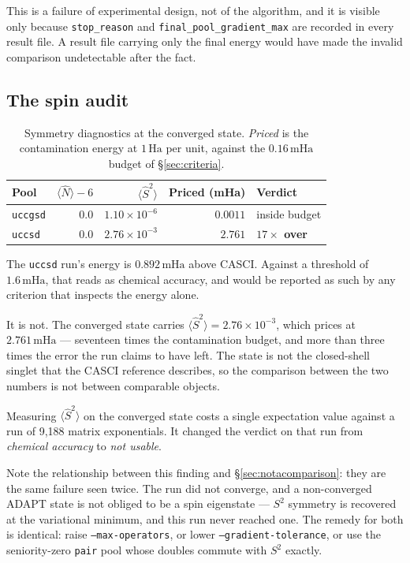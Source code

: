 \documentclass[11pt,a4paper]{article}
\newcommand{\mHa}{\ensuremath{\,\mathrm{mHa}}}
\newcommand{\Ha}{\ensuremath{\,\mathrm{Ha}}}
\newcommand{\Ssq}{\ensuremath{\langle \hat{S}^2 \rangle}}
\newcommand{\Nop}{\ensuremath{\langle \hat{N} \rangle}}
\newcommand{\code}[1]{\texttt{\small #1}}
\begin{document}
This is a failure of experimental design, not of the algorithm, and it is
visible only because \code{stop\_reason} and \code{final\_pool\_gradient\_max}
are recorded in every result file. A result file carrying only the final energy
would have made the invalid comparison undetectable after the fact.

\subsection{The spin audit}
\label{sec:spin}

\begin{table}[htbp]
\centering
\caption{Symmetry diagnostics at the converged state. \emph{Priced} is the
contamination energy at $1\Ha$ per unit, against the $0.16\mHa$ budget of
\S\ref{sec:criteria}.}
\label{tab:spin}
\small
\begin{tabular}{lrrrl}
\toprule
Pool & $\Nop - 6$ & $\Ssq$ & Priced (mHa) & Verdict \\
\midrule
\code{uccgsd} & $0.0$ & $1.10\times10^{-6}$ & $0.0011$ & inside budget \\
\code{uccsd}  & $0.0$ & $2.76\times10^{-3}$ & $\mathbf{2.761}$ & \textbf{$17\times$ over} \\
\bottomrule
\end{tabular}
\end{table}

The \code{uccsd} run's energy is $0.892\mHa$ above CASCI. Against a threshold of
$1.6\mHa$, that reads as chemical accuracy, and would be reported as such by any
criterion that inspects the energy alone.

It is not. The converged state carries $\Ssq = 2.76\times10^{-3}$, which prices
at $2.761\mHa$ --- seventeen times the contamination budget, and more than three
times the error the run claims to have left. The state is not the closed-shell
singlet that the CASCI reference describes, so the comparison between the two
numbers is not between comparable objects.

\begin{result}
Measuring $\Ssq$ on the converged state costs a single expectation value against
a run of 9{,}188 matrix exponentials. It changed the verdict on that run from
\emph{chemical accuracy} to \emph{not usable}.
\end{result}

Note the relationship between this finding and \S\ref{sec:notacomparison}: they
are the same failure seen twice. The run did not converge, and a non-converged
ADAPT state is not obliged to be a spin eigenstate --- $S^2$ symmetry is
recovered at the variational minimum, and this run never reached one. The
remedy for both is identical: raise \code{--max-operators}, or lower
\code{--gradient-tolerance}, or use the seniority-zero \code{pair} pool whose
doubles commute with $S^2$ exactly.
\end{document}
